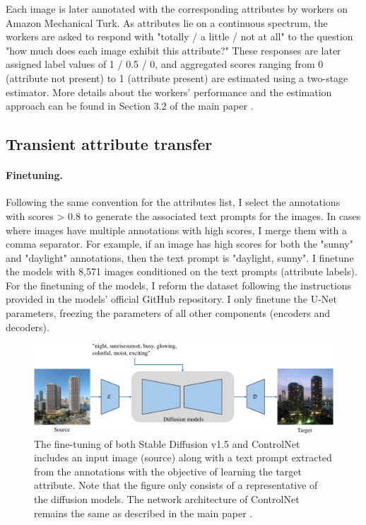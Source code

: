 Each image is later annotated with the corresponding attributes by workers on Amazon Mechanical Turk. As attributes lie on a continuous spectrum, the workers are asked to respond with "totally / a little / not at all" to the question "how much does each image exhibit this attribute?" These responses are later assigned label values of 1 / 0.5 / 0, and aggregated scores ranging from 0 (attribute not present) to 1 (attribute present) are estimated using a two-stage estimator. More details about the workers' performance and the estimation approach can be found in Section 3.2 of the main paper \cite{laffont2014transient}.

\subsection{Transient attribute transfer}

\paragraph{Finetuning.} Following the same convention for the attributes list, I select the annotations with scores > 0.8 to generate the associated text prompts for the images. In cases where images have multiple annotations with high scores, I merge them with a comma separator. For example, if an image has high scores for both the "sunny" and "daylight" annotations, then the text prompt is "daylight, sunny". I finetune the models with 8,571 images conditioned on the text prompts (attribute labels). For the finetuning of the models, I reform the dataset following the instructions provided in the models' official GitHub repository. I only finetune the U-Net parameters, freezing the parameters of all other components (encoders and decoders).

\begin{figure}[ht]
  \includegraphics[width=\textwidth]{Chapters/zero-shot-tat-figs/TAT-overview.pdf}
  \caption{The fine-tuning of both Stable Diffusion v1.5 and ControlNet includes an input image (source) along with a text prompt extracted from the annotations with the objective of learning the target attribute. Note that the figure only consists of a representative of the diffusion models. The network architecture of ControlNet remains the same as described in the main paper \cite{zhang2023adding}.}
  \label{fig:finetuning-overview}
\end{figure}


